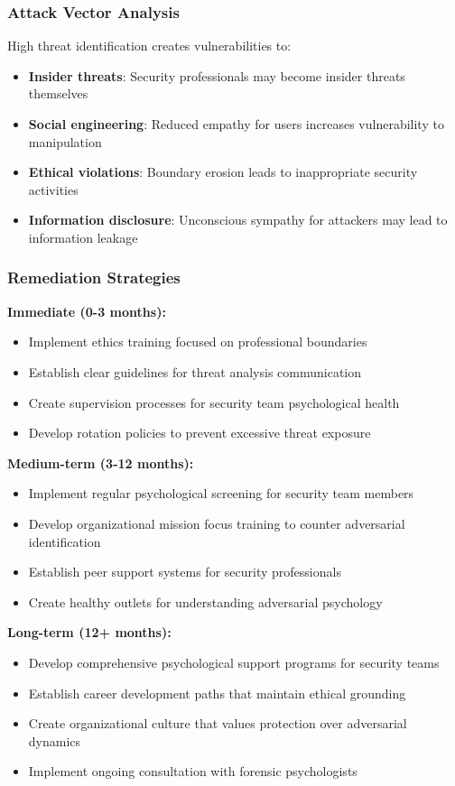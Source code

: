 \documentclass[11pt,a4paper]{article}
\begin{document}
\subsubsection{Attack Vector Analysis}

High threat identification creates vulnerabilities to:

\begin{itemize}
\item \textbf{Insider threats}: Security professionals may become insider threats themselves
\item \textbf{Social engineering}: Reduced empathy for users increases vulnerability to manipulation
\item \textbf{Ethical violations}: Boundary erosion leads to inappropriate security activities
\item \textbf{Information disclosure}: Unconscious sympathy for attackers may lead to information leakage
\end{itemize}

\subsubsection{Remediation Strategies}

\textbf{Immediate (0-3 months):}
\begin{itemize}
\item Implement ethics training focused on professional boundaries
\item Establish clear guidelines for threat analysis communication
\item Create supervision processes for security team psychological health
\item Develop rotation policies to prevent excessive threat exposure
\end{itemize}

\textbf{Medium-term (3-12 months):}
\begin{itemize}
\item Implement regular psychological screening for security team members
\item Develop organizational mission focus training to counter adversarial identification
\item Establish peer support systems for security professionals
\item Create healthy outlets for understanding adversarial psychology
\end{itemize}

\textbf{Long-term (12+ months):}
\begin{itemize}
\item Develop comprehensive psychological support programs for security teams
\item Establish career development paths that maintain ethical grounding
\item Create organizational culture that values protection over adversarial dynamics
\item Implement ongoing consultation with forensic psychologists
\end{itemize}
\end{document}
